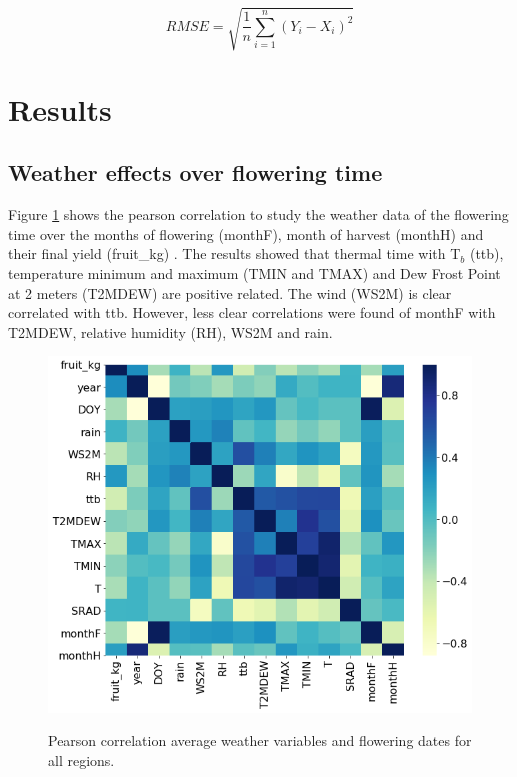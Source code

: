 \documentclass[gene,journal,article,submit,moreauthors,pdftex]{Definitions/mdpi}
\begin{document}
\begin{equation}
RMSE= \sqrt{\frac{1}{n}  \sum_{i=1}^{n} (Y_{i}-X_{i})^{2} } 
\label{equ:RMSE}
\end{equation}



\section{Results}

\subsection{Weather effects over flowering time }

Figure \ref{fig:heat} shows the pearson correlation to study the weather data of the flowering time over the months of flowering  (monthF), month of harvest (monthH) and their final yield (fruit\_kg) . The results showed that thermal time with T$_{b}$ (ttb), temperature minimum and maximum (TMIN and TMAX) and Dew Frost Point at 2 meters (T2MDEW) are positive related. The wind (WS2M) is clear correlated with ttb. However, less clear correlations were found of monthF  with T2MDEW, relative humidity (RH), WS2M and rain.  

\begin{figure}[h!]
	\centering
	\includegraphics[scale=0.35]{images/heatm.png}\\
	\caption{\footnotesize {Pearson correlation average weather variables and flowering dates for all regions. \\}}
	\label{fig:heat} 
\end{figure}
\newpage
\end{document}

